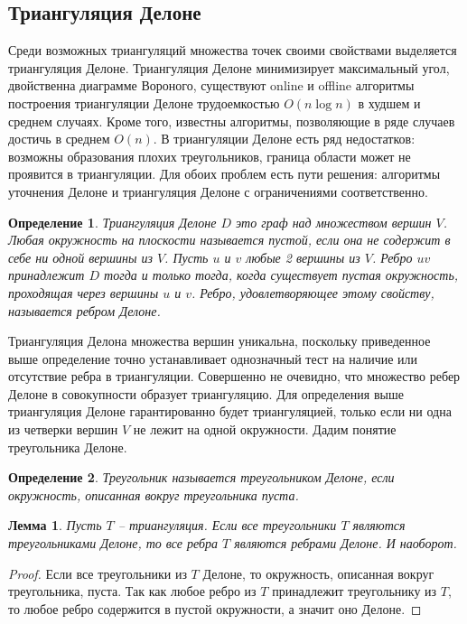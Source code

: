 \documentclass{fefu}
\newtheorem{definition}{Определение}
\newtheorem{lemma}{Лемма}
\begin{document}
\subsection{Триангуляция Делоне}
Среди возможных триангуляций множества точек своими свойствами выделяется триангуляция Делоне. Триангуляция Делоне
минимизирует максимальный угол, двойственна диаграмме Вороного, существуют online и offline алгоритмы построения
триангуляции Делоне трудоемкостью $O(n\log{}n)$ в худшем и среднем случаях. Кроме того, известны алгоритмы, позволяющие
в ряде случаев достичь в среднем $O(n)$. В триангуляции Делоне есть ряд недостатков: возможны образования плохих
треугольников, граница области может не проявится в триангуляции. Для обоих проблем есть пути решения: алгоритмы
уточнения Делоне \cite{DelaunayRefinement} и триангуляция Делоне с ограничениями соответственно.
\begin{definition}
    \textit{Триангуляция Делоне} $D$ это граф над множеством вершин $V$. Любая окружность на плоскости
    называется \textit{пустой}, если она не содержит в себе ни одной вершины из $V$. Пусть $u$ и $v$ любые 2 вершины из
    $V$. Ребро $uv$ принадлежит $D$ тогда и только тогда, когда существует пустая окружность, проходящая через вершины
    $u$ и $v$. Ребро, удовлетворяющее этому свойству, называется ребром Делоне.
\end{definition}
Триангуляция Делона множества вершин уникальна, поскольку приведенное выше определение точно устанавливает однозначный
тест на наличие или отсутствие ребра в триангуляции.
Совершенно не очевидно, что множество ребер Делоне в совокупности образует триангуляцию. Для определения
выше триангуляция Делоне гарантированно будет триангуляцией, только если ни одна из четверки вершин $V$ не лежит на одной
окружности. Дадим понятие треугольника Делоне.
\begin{definition}
    Треугольник называется треугольником Делоне, если окружность, описанная вокруг треугольника пуста.
\end{definition}
\begin{lemma}
    Пусть $T$ -- триангуляция. Если все треугольники $T$ являются треугольниками Делоне, то все ребра $T$ являются
    ребрами Делоне. И наоборот.
\end{lemma}
\begin{proof}
    Если все треугольники из $T$ Делоне, то окружность, описанная вокруг треугольника, пуста. Так как любое ребро
    из $T$ принадлежит треугольнику из $T$, то любое ребро содержится в пустой окружности, а значит оно Делоне.
\end{proof}
\end{document}
